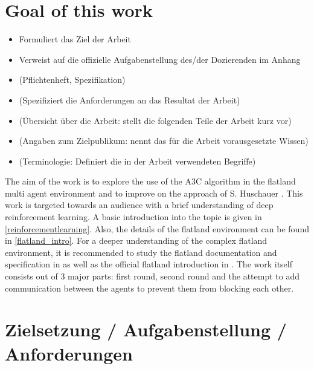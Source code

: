 

\section{Goal of this work}\label{zielsetzung}
\begin{itemize}
\item Formuliert das Ziel der Arbeit
\item Verweist auf die offizielle Aufgabenstellung des/der Dozierenden im Anhang
\item (Pflichtenheft, Spezifikation)
\item (Spezifiziert die Anforderungen an das Resultat der Arbeit)
\item (Übersicht über die Arbeit: stellt die folgenden Teile der Arbeit kurz vor)
\item (Angaben zum Zielpublikum: nennt das für die Arbeit vorausgesetzte Wissen)
\item (Terminologie: Definiert die in der Arbeit verwendeten Begriffe)
\end{itemize}
The aim of the work is to explore the use of the A3C algorithm in the flatland multi agent environment and to improve on the approach of S. Huschauer \cite{flatlandstephan}.
This work is targeted towards an audience with a brief understanding of deep reinforcement learning. A basic introduction into the topic is given in \autoref{reinforcementlearning}.
Also, the details of the flatland environment can be found in \autoref{flatland_intro}. For a deeper understanding of the complex flatland environment, it is recommended to study the flatland documentation and specification in \cite{flatland_docu} as well as the official flatland introduction in \cite{aicrowd}.
The work itself consists out of 3 major parts: 
first round, second round and the attempt to add communication between the agents to prevent them from blocking each other. \\


\section{Zielsetzung / Aufgabenstellung / Anforderungen}\label{zielsetzung}



